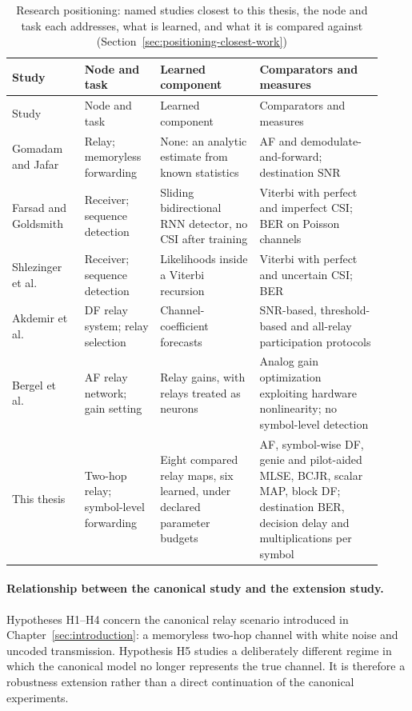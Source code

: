 \begin{longtable}[]{@{}>{\raggedright\arraybackslash}p{0.17\linewidth}>{\raggedright\arraybackslash}p{0.19\linewidth}>{\raggedright\arraybackslash}p{0.25\linewidth}>{\raggedright\arraybackslash}p{0.31\linewidth}@{}}
\caption[Research positioning]{Research positioning: named studies closest to this thesis, the node and task each addresses, what is learned, and what it is compared against (Section~\ref{sec:positioning-closest-work})}\label{tbl:table17}\tabularnewline
\toprule\noalign{}
Study & Node and task & Learned component & Comparators and measures \\
\midrule\noalign{}
\endfirsthead
\toprule\noalign{}
Study & Node and task & Learned component & Comparators and measures \\
\midrule\noalign{}
\endhead
\bottomrule\noalign{}
\endlastfoot
Gomadam and Jafar~\cite{GomadamJafar2007EF} & Relay; memoryless forwarding & None: an analytic estimate from known statistics & AF and demodulate-and-forward; destination SNR \\
Farsad and Goldsmith~\cite{FarsadGoldsmith2018NNDetection} & Receiver; sequence detection & Sliding bidirectional RNN detector, no CSI after training & Viterbi with perfect and imperfect CSI; BER on Poisson channels \\
Shlezinger et al.~\cite{Shlezinger2020ViterbiNet} & Receiver; sequence detection & Likelihoods inside a Viterbi recursion & Viterbi with perfect and uncertain CSI; BER \\
Akdemir et al.~\cite{Akdemir2024DLRelaySelection} & DF relay system; relay selection & Channel-coefficient forecasts & SNR-based, threshold-based and all-relay participation protocols \\
Bergel et al.~\cite{Bergel2023RelaysAsNeurons} & AF relay network; gain setting & Relay gains, with relays treated as neurons & Analog gain optimization exploiting hardware nonlinearity; no symbol-level detection \\
This thesis & Two-hop relay; symbol-level forwarding & Eight compared relay maps, six learned, under declared parameter budgets & AF, symbol-wise DF, genie and pilot-aided MLSE, BCJR, scalar MAP, block DF; destination BER, decision delay and multiplications per symbol \\
\end{longtable}

\paragraph{Relationship between the canonical study and the extension study.} Hypotheses H1--H4 concern the canonical relay scenario introduced in Chapter~\ref{sec:introduction}: a memoryless two-hop channel with white noise and uncoded transmission. Hypothesis H5 studies a deliberately different regime in which the canonical model no longer represents the true channel. It is therefore a robustness extension rather than a direct continuation of the canonical experiments.

